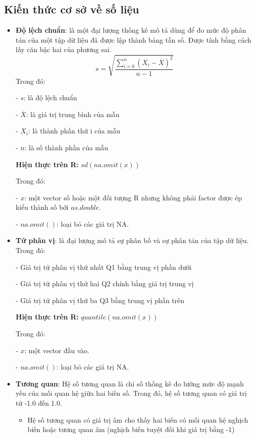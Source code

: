 \documentclass[a4paper]{article}
\theoremstyle{definition}
\begin{document}
\subsection{Kiến thức cơ sở về số liệu}
\begin{itemize}
    \item {\bf Độ lệch chuẩn}: là một đại lượng thống kê mô tả dùng để đo mức độ phân tán của một tập dữ liệu đã được lập thành bảng tần số. Được tính bằng cách lấy căn bậc hai của phương sai.
        \[s = \sqrt {\frac{{\sum\limits_{i = 0}^n {{{\left( {{X_i} - \overline X } \right)}^2}} }}{{n - 1}}} \]
        Trong đó:
        
        - $s$: là độ lệch chuẩn 
        
        - $\overline X$: là giá trị trung bình của mẫu
        
        - ${X_i}$: là thành phần thứ i của mẫu
        
        - $n$: là số thành phần của mẫu
        
        {\bf Hiện thực trên R:} $sd\left( {na.omit\left( x \right)} \right)$
        
        Trong đó:
        
        - $x$: một vector số hoặc một đối tượng R nhưng không phải factor được ép kiểu thành số bởi $as.double$.
        
        - $na.omit()$: loại bỏ các giá trị NA.
        
    \item {\bf Tứ phân vị}: là đại lượng mô tả sự phân bố và sự phân tán của tập dữ liệu.
        Trong đó:
        
        - Giá trị tứ phân vị thứ nhất Q1 bằng trung vị phần dưới
        
        - Giá trị tứ phân vị thứ hai Q2 chính bằng giá trị trung vị
        
        - Giá trị tứ phân vị thứ ba Q3 bằng trung vị phần trên
        
        {\bf Hiện thực trên R:} $quantile(na.omit(x))$
        
        Trong đó:
        
        - $x$: một vector đầu vào.
        
        - $na.omit()$: loại bỏ các giá trị NA.
        
    \item {\bf Tương quan}: Hệ số tương quan là chỉ số thống kê đo lường mức độ mạnh yếu của mối quan hệ giữa hai biến số. Trong đó, hệ số tương quan có giá trị từ -1.0 đến 1.0.
    \begin{itemize}
        \item Hệ số tương quan có giá trị âm cho thấy hai biến có mối quan hệ nghịch biến hoặc tương quan âm (nghịch biến tuyệt đối khi giá trị bằng -1)


\end{itemize}
\end{itemize}
\end{document}
